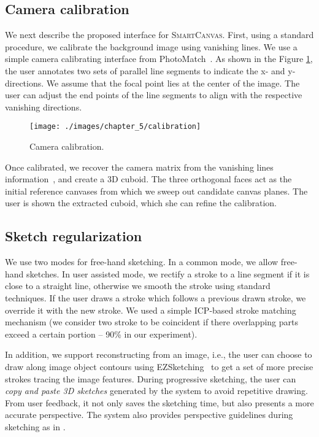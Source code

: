 \subsection{Camera calibration}

We next describe the proposed interface for \textsc{SmartCanvas}. First, using a standard procedure, we calibrate the background image using vanishing lines. We use a simple camera calibrating interface from PhotoMatch~\cite{google-sketchup}.
As shown in the Figure \ref{fig:calibration}, the user annotates two sets of parallel line segments to indicate the x- and y-directions. We assume that the focal point lies at the center of the image. The user can adjust the end points of the line segments to align with the respective vanishing directions.


\begin{figure}\centering
  \vnudge
  \texttt{[image: ./images/chapter\_5/calibration]}
  \caption{Camera calibration.}
  \label{fig:calibration}
\end{figure}

Once calibrated, we recover the camera matrix from the vanishing lines information~\cite{Criminisi:2000:SVM}, and create a 3D cuboid. The three orthogonal faces act as the initial reference canvases from which we sweep out candidate canvas planes. The user is shown the extracted cuboid, which she can refine the calibration.




\subsection{Sketch regularization}

We use two modes for free-hand sketching. In a common mode, we allow free-hand sketches. In user assisted mode, we rectify a stroke to a line segment if it is close to a straight line, otherwise we smooth the stroke using standard techniques. If the user draws a stroke which follows a previous drawn stroke, we override it with the new stroke. We used a simple ICP-based stroke matching mechanism (we consider two stroke to be coincident if there overlapping parts exceed a certain portion -- 90\% in our experiment).

In addition, we support reconstructing from an image, i.e., the user can choose to draw along image object contours using EZSketching~\cite{EZSketching:2014} to get a set of more precise strokes tracing the image features.
During progressive sketching, the user can \emph{copy and paste 3{D} sketches} generated by the system to avoid repetitive drawing. From user feedback, it not only saves the sketching time, but also presents a more accurate perspective. The system also provides perspective guidelines during sketching as in \cite{ilovesketch08}.

